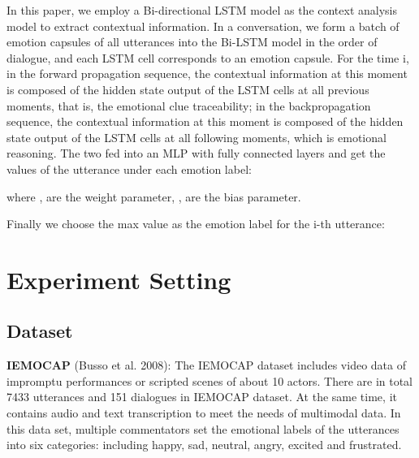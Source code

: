 \documentclass[11pt]{article}
\begin{document}
In this paper, we employ a Bi-directional LSTM model as the context analysis model to extract contextual information. 
In a conversation, we form a batch of emotion capsules of all utterances into the Bi-LSTM model in the order of dialogue, and each LSTM cell corresponds to an emotion capsule.  For the time i, in the forward propagation sequence, the contextual information  at this moment is composed of the hidden state output of the LSTM cells at all previous moments, that is, the emotional clue traceability; in the backpropagation sequence, the contextual information at this moment is composed of the hidden state output of the LSTM cells at all following moments, which is emotional reasoning. The two fed into an MLP with fully connected layers and get the values of the utterance  under each emotion label:

	

where ,  are the weight parameter, ,  are the bias parameter.

Finally we choose the max value as the emotion label  for the i-th utterance:


\section{Experiment Setting}

\subsection{Dataset}
\noindent\textbf{IEMOCAP} (Busso et al. 2008): The IEMOCAP dataset includes video data of impromptu performances or scripted scenes of about 10 actors. There are in total 7433 utterances and 151 dialogues in IEMOCAP dataset. At the same time, it contains audio and text transcription to meet the needs of multimodal data. In this data set, multiple commentators set the emotional labels of the utterances into six categories: including happy, sad, neutral, angry, excited and frustrated.
\end{document}
